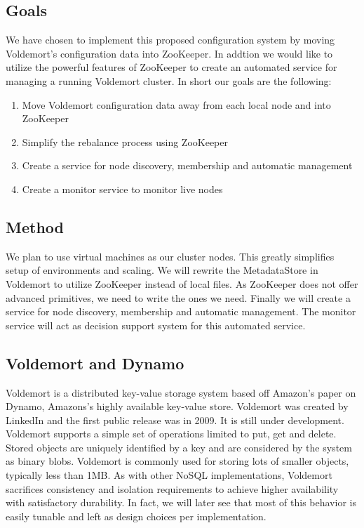 \subsection{Goals}
We have chosen to implement this proposed configuration system by moving Voldemort's configuration data into ZooKeeper. In addtion we would like to utilize the powerful features of ZooKeeper to create an automated service for managing a running Voldemort cluster. In short our goals are the following:

\begin{enumerate}
	\item{Move Voldemort configuration data away from each local node and into ZooKeeper}
	\item{Simplify the rebalance process using ZooKeeper}
	\item{Create a service for node discovery, membership and automatic management}
	\item{Create a monitor service to monitor live nodes}
\end{enumerate}

\subsection{Method}
We plan to use virtual machines as our cluster nodes. This greatly simplifies setup of environments and scaling. We will rewrite the MetadataStore in Voldemort to utilize ZooKeeper instead of local files. As ZooKeeper does not offer advanced primitives, we need to write the ones we need. Finally we will create a service for node discovery, membership and automatic management. The monitor service will act as decision support system for this automated service. 

\subsection{Voldemort and Dynamo}
Voldemort is a distributed key-value storage system based off Amazon's paper on Dynamo, Amazons's highly available key-value store. Voldemort was created by LinkedIn and the first public release was in 2009. It is still under development. Voldemort supports a simple set of operations limited to put, get and delete. Stored objects are uniquely identified by a key and are considered by the system as binary blobs. Voldemort is commonly used for storing lots of smaller objects, typically less than 1MB.  As with other NoSQL implementations, Voldemort sacrifices consistency and isolation requirements to achieve higher availability with satisfactory durability. In fact, we will later see that most of this behavior is easily tunable and left as design choices per implementation.


